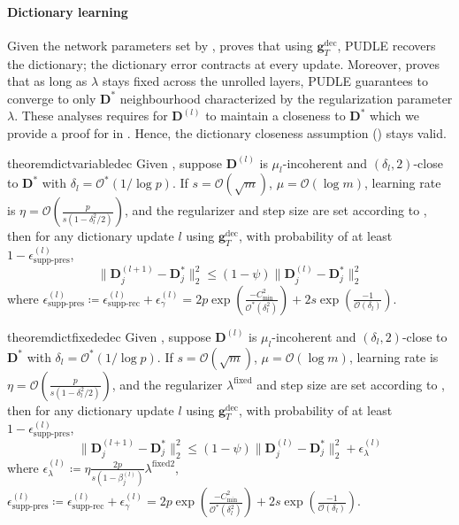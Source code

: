 \documentclass[10pt]{article} %
\newcommand{\D}{{\bm D}}
\newcommand{\g}{{\bm g}}
\begin{document}
\paragraph{Dictionary learning} Given the network parameters set by ,  proves that using $\g_T^{\text{dec}}$, PUDLE recovers the dictionary; the dictionary error contracts at every update. Moreover,  proves that as long as $\lambda$ stays fixed across the unrolled layers, PUDLE guarantees to converge to only $\D^{\ast}$ neighbourhood characterized by the regularization parameter $\lambda$. These analyses requires for $\D^{(l)}$ to maintain a closeness to $\D^{\ast}$ which we provide a proof for in . Hence, the dictionary closeness assumption () stays valid.
%
\begin{restatable}{theorem}{dictvariabledec}\label{thm:dictvariabledec}
Given , suppose $\D^{(l)}$ is $\mu_l$-incoherent and $(\delta_l,2)$-close to $\D^{\ast}$ with $\delta_l = \mathcal{O}^{\ast}(1 / \log{p})$. If $s = \mathcal{O}(\sqrt{m})$, $\mu = \mathcal{O}(\log{m})$, learning rate is $\eta = \mathcal{O}(\frac{p}{s (1 - \delta_l^2/2)})$, and the regularizer and step size are set according to , then for any dictionary update $l$ using $\g_T^{\text{dec}}$, with probability of at least $1 - \epsilon^{(l)}_{\text{supp-pres}}$, 
\begin{equation}
    \| \D_j^{(l+1)} - \D_j^{\ast} \|_2^2 \leq (1 - \psi)   \| \D_j^{(l)} - \D_j^{\ast} \|_2^2 
\end{equation}
where $\epsilon^{(l)}_{\text{supp-pres}} \coloneqq \epsilon^{(l)}_{\text{supp-rec}} + \epsilon^{(l)}_{\gamma} = 2 p \exp{(\frac{-C_{\min}^2}{\mathcal{O}^{\ast}(\delta_l^2)})}+ 2 s \exp{(\frac{-1}{\mathcal{O}(\delta_l)})}$.
\end{restatable}
%
\begin{restatable}{theorem}{dictfixededec}\label{thm:dictfixededec}
Given , suppose $\D^{(l)}$ is $\mu_l$-incoherent and $(\delta_l,2)$-close to $\D^{\ast}$ with $\delta_l = \mathcal{O}^{\ast}(1 / \log{p})$. If $s = \mathcal{O}(\sqrt{m})$, $\mu = \mathcal{O}(\log{m})$, learning rate is $\eta = \mathcal{O}(\frac{p}{s (1 - \delta_l^2/2)})$, and the regularizer $\lambda^{\text{fixed}}$ and step size are set according to , then for any dictionary update $l$ using $\g_T^{\text{dec}}$, with probability of at least $1 - \epsilon^{(l)}_{\text{supp-pres}}$, 
\begin{equation}
    \| \D_j^{(l+1)} - \D_j^{\ast} \|_2^2 \leq (1 - \psi)   \| \D_j^{(l)} - \D_j^{\ast} \|_2^2 + \epsilon_{\lambda}^{(l)}
\end{equation}
where $\epsilon_{\lambda}^{(l)} \coloneqq \eta \frac{2p}{s(1 - \beta_j^{(l)})} \lambda^{\text{fixed}2}$, $\epsilon^{(l)}_{\text{supp-pres}} \coloneqq \epsilon^{(l)}_{\text{supp-rec}} + \epsilon^{(l)}_{\gamma} = 2 p \exp{(\frac{-C_{\min}^2}{\mathcal{O}^{\ast}(\delta_l^2)})}+ 2 s \exp{(\frac{-1}{\mathcal{O}(\delta_l)})}$.
\end{restatable}
%
%
\end{document}
